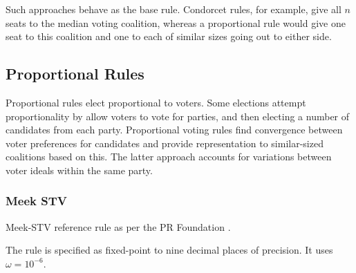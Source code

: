 Such approaches behave as the base rule.  Condorcet rules, for example, give all $n$ seats to the median voting coalition, whereas a proportional rule would give one seat to this coalition and one to each of similar sizes going out to either side.

\subsection{Proportional Rules}

Proportional rules elect proportional to voters.  Some elections attempt proportionality by allow voters to vote for parties, and then electing a number of candidates from each party.  Proportional voting rules find convergence between voter preferences for candidates and provide representation to similar-sized coalitions based on this.  The latter approach accounts for variations between voter ideals within the same party.

\subsubsection{Meek STV}

Meek-STV reference rule as per the PR Foundation \autocite{Lundell2010}.

The rule is specified as fixed-point to nine decimal places of precision.  It uses $\omega = 10^{-6}$.


